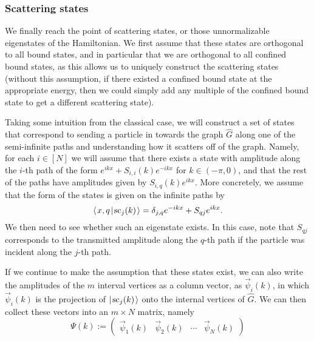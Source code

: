 \documentclass[../thesis-main/thesis-main]{subfiles}
\begin{document}


\subsubsection{Scattering states}

We finally reach the point of scattering states, or those unnormalizable eigenstates of the Hamiltonian.  We first assume that these states are orthogonal to all bound states, and in particular that we are orthogonal to all confined bound states, as this allows us to uniquely construct the scattering states (without this assumption, if there existed a confined bound state at the appropriate energy, then we could simply add any multiple of the confined bound state to get a different scattering state).

Taking some intuition from the classical case, we will construct a set of states that correspond to sending a particle in towards the graph $\widehat{G}$ along one of the semi-infinite paths and understanding how it scatters off of the graph.  Namely, for each $i\in[N]$ we will assume that there exists a state with amplitude along the $i$-th path of the form $e^{i k x} + S_{i,i}(k)e^{-i k x}$ for $k\in (-\pi, 0)$, and that the rest of the paths have amplitudes given by $S_{i,q}(k)e^{ikx}$.  More concretely, we assume that the form of the states is given on the infinite paths by
\begin{equation}
  \langle\mspace{2mu} x,q \mspace{2mu} | \mspace{2mu} \text{sc}_{j}(k)\mspace{2mu} \rangle = \delta_{j,q} e^{-i k x} + S_{qj} e^{i k x}.\label{eq:scattering_amplitude_paths}
\end{equation}
We then need to see whether such an eigenstate exists.  In this case, note that $S_{qj}$ corresponds to the transmitted amplitude along the $q$-th path if the particle was incident along the $j$-th path.

If we continue to make the assumption that these states exist, we can also write the amplitudes of the $m$ interval vertices as a column vector, as $\vec{\psi}_i(k)$, in which $\vec{\psi}_{i}(k)$ is the projection of $|\mspace{2mu} \text{sc}_j(k) \mspace{2mu} \rangle$ onto the internal vertices of $\widehat{G}$.  We can then collect these vectors into an $m\times N$ matrix, namely
\begin{equation}
  \Psi(k) := \begin{pmatrix} \vec{\psi}_1(k) & \vec{\psi}_2(k) & \cdots & \vec{\psi}_N(k)\end{pmatrix}
\end{equation}
\end{document}
